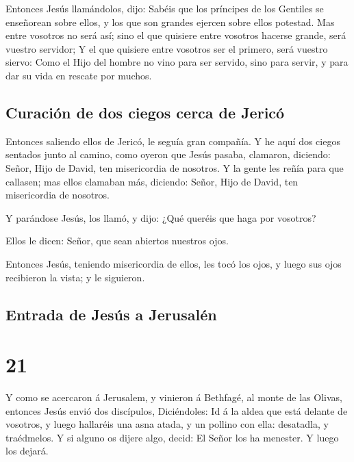  Entonces Jesús llamándolos, dijo: Sabéis que los
príncipes de los Gentiles se enseñorean sobre ellos, y los que son
grandes ejercen sobre ellos potestad.  Mas entre vosotros
no será así; sino el que quisiere entre vosotros hacerse grande, será
vuestro servidor;  Y el que quisiere entre vosotros ser
el primero, será vuestro siervo:  Como el Hijo del hombre
no vino para ser servido, sino para servir, y para dar su vida en
rescate por muchos.

\hypertarget{curaciuxf3n-de-dos-ciegos-cerca-de-jericuxf3}{%
\subsection{Curación de dos ciegos cerca de
Jericó}\label{curaciuxf3n-de-dos-ciegos-cerca-de-jericuxf3}}

 Entonces saliendo ellos de Jericó, le seguía gran
compañía.  Y he aquí dos ciegos sentados junto al camino,
como oyeron que Jesús pasaba, clamaron, diciendo: Señor, Hijo de David,
ten misericordia de nosotros.  Y la gente les reñía para
que callasen; mas ellos clamaban más, diciendo: Señor, Hijo de David,
ten misericordia de nosotros.

 Y parándose Jesús, los llamó, y dijo: ¿Qué queréis que
haga por vosotros?

 Ellos le dicen: Señor, que sean abiertos nuestros ojos.

 Entonces Jesús, teniendo misericordia de ellos, les tocó
los ojos, y luego sus ojos recibieron la vista; y le siguieron.

\hypertarget{entrada-de-jesuxfas-a-jerusaluxe9n}{%
\subsection{Entrada de Jesús a
Jerusalén}\label{entrada-de-jesuxfas-a-jerusaluxe9n}}

\hypertarget{section-20}{%
\section{21}\label{section-20}}

 Y como se acercaron á Jerusalem, y vinieron á Bethfagé,
al monte de las Olivas, entonces Jesús envió dos discípulos,
 Diciéndoles: Id á la aldea que está delante de vosotros,
y luego hallaréis una asna atada, y un pollino con ella: desatadla, y
traédmelos.  Y si alguno os dijere algo, decid: El Señor
los ha menester. Y luego los dejará.

